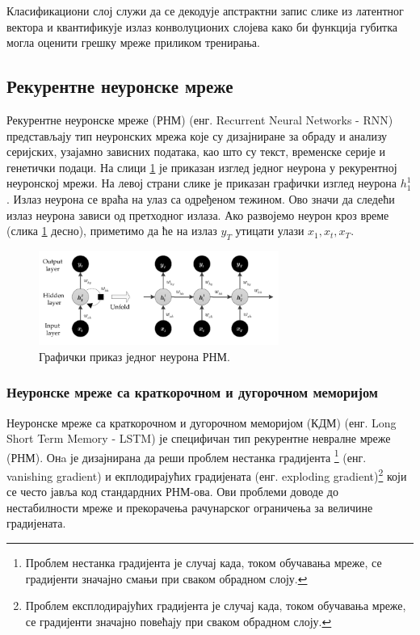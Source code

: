 \documentclass[a4paper, 12pt, master, utf8]{etf}
\begin{document}
Класификациони слој служи да се декодује апстрактни запис слике из латентног вектора и квантификује излаз конволуционих слојева како би функција губитка могла оценити
грешку мреже приликом тренирања.

\subsection{Рекурентне неуронске мреже}
\label{sec:233}

Рекурентне неуронске мреже (РНМ) (енг. Recurrent Neural Networks - RNN) представљају тип неуронских мрежа које су дизајниране за обраду и анализу 
серијских, узајамно зависних података, као што су текст, временске серије и генетички подаци. На слици \ref{fig:rnn} је приказан изглед
једног неурона у рекурентној неуронској мрежи. На левој страни слике је приказан графички изглед неурона $h^{1}_1$. Излаз неурона се враћа на улаз са одређеном тежином.
Ово значи да следећи излаз неурона зависи од претходног излаза. Ако развојемо неурон кроз време (слика \ref*{fig:rnn} десно), приметимо да ће на излаз $y_T$ утицати
улази $x_1 , x_t, x_T$.

\begin{figure}[h]
    \centering
    \includegraphics[width=0.7\textwidth]{images/rnn.png}
    \caption{Графички приказ једног неурона РНМ. \cite{husein_day-ahead_2019}}
    \label{fig:rnn}
\end{figure}

\subsubsection{Неуронске мреже са краткорочном и дугорочном меморијом}

Неуронске мреже са краткорочном и дугорочном меморијом (КДМ) (енг. Long Short Term Memory - LSTM) је специфичан тип рекурентне невралне мреже (РНМ).
Онa је дизајнирана да реши проблем нестанка градијента \footnote{Проблем нестанка градијента је случај када, током обучавања мреже, се градијенти значајно смањи при сваком обрадном слоју.} (енг. vanishing gradient) и 
екплодирајућих градијената (енг. exploding gradient)\footnote{Проблем експлодирајућих градијента је случај када, током обучавања мреже, се градијенти значајно повећају при сваком обрадном слоју.} који се често јавља код стандардних РНМ-ова.
Ови проблеми доводе до нестабилности мреже и прекорачења рачунарског ограничења за величине градијената.
\newline
\end{document}
